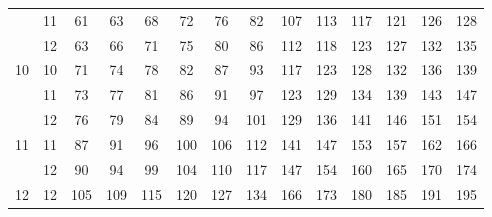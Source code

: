 \begin{center}
\begin{tabular}[t]{|c|c|*{6}{c}|*{6}{c}|}
     & 11 &  61 &  63 &  68 &  72 &  76 &  82 & 107 & 113 & 117 & 121 & 126 & 128 \\
     & 12 &  63 &  66 &  71 &  75 &  80 &  86 & 112 & 118 & 123 & 127 & 132 & 135 \\
  \hline
  10 & 10 &  71 &  74 &  78 &  82 &  87 &  93 & 117 & 123 & 128 & 132 & 136 & 139 \\
     & 11 &  73 &  77 &  81 &  86 &  91 &  97 & 123 & 129 & 134 & 139 & 143 & 147 \\
     & 12 &  76 &  79 &  84 &  89 &  94 & 101 & 129 & 136 & 141 & 146 & 151 & 154 \\
  \hline
  11 & 11 &  87 &  91 &  96 & 100 & 106 & 112 & 141 & 147 & 153 & 157 & 162 & 166 \\
     & 12 &  90 &  94 &  99 & 104 & 110 & 117 & 147 & 154 & 160 & 165 & 170 & 174 \\
  \hline
  12 & 12 & 105 & 109 & 115 & 120 & 127 & 134 & 166 & 173 & 180 & 185 & 191 & 195 \\
  \hline
  \end{tabular}

\end{center}


